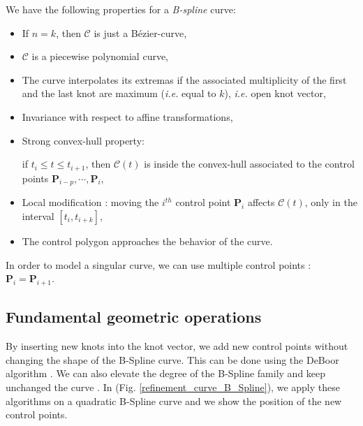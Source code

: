 We have the following properties for a \textit{B-spline} curve:
\begin{itemize}
\item If $n=k$, then $\mathcal{C}$ is just a B\'ezier-curve,
\item $\mathcal{C}$ is a piecewise polynomial curve,
\item The curve interpolates its extremas if the associated multiplicity of the first and the last knot are maximum (\textit{i.e.} equal to $k$), \textit{i.e.} open knot vector,
\item Invariance with respect to affine transformations,
\item Strong convex-hull property:

if $t_i \leq t \leq t_{i+1}$, then $\mathcal{C}(t)$ is inside the convex-hull associated to the control points $\mathbf{P}_{i-p},\cdots,\mathbf{P}_{i}$,

\item Local modification : moving the $i^{th}$ control point $\mathbf{P}_{i}$ affects $\mathcal{C}(t)$, only in the interval $[t_i,t_{i+k}]$,
\item The control polygon approaches the behavior of the curve.
\end{itemize}
\begin{remark} 
In order to model a singular curve, we can use multiple control points : $\mathbf{P}_{i}=\mathbf{P}_{i+1}$.
\end{remark}

\subsection{Fundamental geometric operations }
By inserting new knots into the knot vector, we add new control points without changing the shape of the B-Spline curve. This can be done using the DeBoor algorithm \cite{DeBoor_Book2001}. We can also elevate the degree of the B-Spline family and keep unchanged the curve \cite{qi}. In (Fig. \ref{refinement_curve_B_Spline}), we apply these algorithms on a quadratic B-Spline curve and we show the position of the new control points.  
\\
